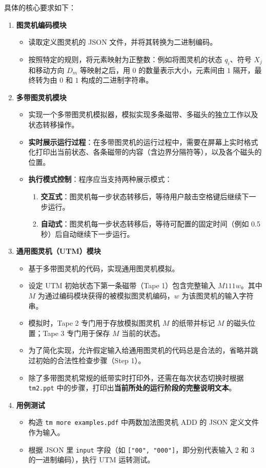 \documentclass{sysucseexp}
\begin{document}
具体的核心要求如下：
\begin{enumerate}
    \item \textbf{图灵机编码模块}
    \begin{itemize}
        \item 读取定义图灵机的 JSON 文件，并将其转换为二进制编码。
        \item 按照特定的规则，将元素映射为正整数：例如将图灵机的状态 $q_i$、符号 $X_j$ 和移动方向 $D_m$ 等映射之后，用 $0$ 的数量表示大小，元素间由 $1$ 隔开，最终转为由 $0$ 和 $1$ 构成的二进制字符串。
    \end{itemize}

    \item \textbf{多带图灵机模块}
    \begin{itemize}
        \item 实现一个多带图灵机模拟器，模拟实现多条磁带、多磁头的独立工作以及状态转移操作。
        \item \textbf{实时展示运行过程}：在多带图灵机的运行过程中，需要在屏幕上实时格式化打印出当前状态、各条磁带的内容（含边界分隔符等），以及各个磁头的位置。
        \item \textbf{执行模式控制}：程序应当支持两种展示模式：
        \begin{enumerate}
            \item \textbf{交互式}：图灵机每一步状态转移后，等待用户敲击空格键后继续下一步运行。
            \item \textbf{自动式}：图灵机每一步状态转移后，等待可配置的固定时间（例如 0.5 秒）后自动继续下一步运行。
        \end{enumerate}
    \end{itemize}

    \item \textbf{通用图灵机（UTM）模块}
    \begin{itemize}
        \item 基于多带图灵机的代码，实现通用图灵机模拟。
        \item 设定 UTM 初始状态下第一条磁带（Tape 1）包含完整输入 $M 111 w$。其中 $M$ 为通过编码模块获得的被模拟图灵机编码，$w$ 为该图灵机的输入字符串。
        \item 模拟时，Tape 2 专门用于存放模拟图灵机 $M$ 的纸带并标记 $M$ 的磁头位置；Tape 3 专门用于保存 $M$ 当前的状态。
        \item 为了简化实现，允许假定输入给通用图灵机的代码总是合法的，省略并跳过初始的合法性检查步骤（Step 1）。
        \item 除了多带图灵机常规的纸带实时打印外，还需在每次状态切换时根据 \texttt{tm2.ppt} 中的步骤，打印出\textbf{当前所处的运行阶段的完整说明文本}。
    \end{itemize}

    \item \textbf{用例测试}
    \begin{itemize}
        \item 构造 \texttt{tm more examples.pdf} 中两数加法图灵机 ADD 的 JSON 定义文件作为输入。
        \item 根据 JSON 里 \texttt{input} 字段（如 \texttt{["00", "000"]}，即分别代表输入 2 和 3 的一进制编码），执行 UTM 运转测试。
    \end{itemize}
\end{enumerate}
\end{document}

